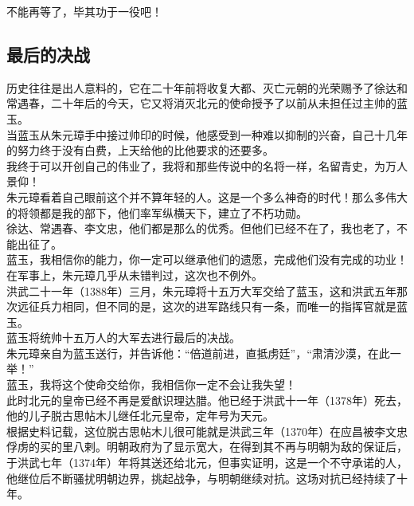 \begin{multicols}{\theparacolNo}
不能再等了，毕其功于一役吧！\\

\subsection{最后的决战}
历史往往是出人意料的，它在二十年前将收复大都、灭亡元朝的光荣赐予了徐达和常遇春，二十年后的今天，它又将消灭北元的使命授予了以前从未担任过主帅的蓝玉。\\

当蓝玉从朱元璋手中接过帅印的时候，他感受到一种难以抑制的兴奋，自己十几年的努力终于没有白费，上天给他的比他要求的还要多。\\

我终于可以开创自己的伟业了，我将和那些传说中的名将一样，名留青史，为万人景仰！\\

朱元璋看着自己眼前这个并不算年轻的人。这是一个多么神奇的时代！那么多伟大的将领都是我的部下，他们率军纵横天下，建立了不朽功勋。\\

徐达、常遇春、李文忠，他们都是那么的优秀。但他们已经不在了，我也老了，不能出征了。\\

蓝玉，我相信你的能力，你一定可以继承他们的遗愿，完成他们没有完成的功业！\\

在军事上，朱元璋几乎从未错判过，这次也不例外。\\

洪武二十一年（1388年）三月，朱元璋将十五万大军交给了蓝玉，这和洪武五年那次远征兵力相同，但不同的是，这次的进军路线只有一条，而唯一的指挥官就是蓝玉。\\

蓝玉将统帅十五万人的大军去进行最后的决战。\\

朱元璋亲自为蓝玉送行，并告诉他：“倍道前进，直抵虏廷”，“肃清沙漠，在此一举！”\\

蓝玉，我将这个使命交给你，我相信你一定不会让我失望！\\

此时北元的皇帝已经不再是爱猷识理达腊。他已经于洪武十一年（1378年）死去，他的儿子脱古思帖木儿继任北元皇帝，定年号为天元。\\

根据史料记载，这位脱古思帖木儿很可能就是洪武三年（1370年）在应昌被李文忠俘虏的买的里八剌。明朝政府为了显示宽大，在得到其不再与明朝为敌的保证后，于洪武七年（1374年）年将其送还给北元，但事实证明，这是一个不守承诺的人，他继位后不断骚扰明朝边界，挑起战争，与明朝继续对抗。这场对抗已经持续了十年。\\


\end{multicols}
